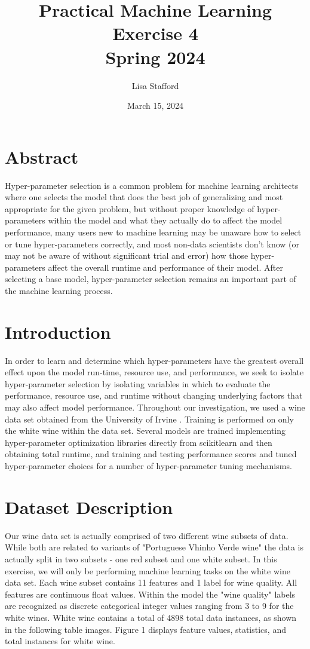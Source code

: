 \documentclass[titlepage]{article}
\title{%
	Practical Machine Learning\\
	
	\vspace*{2em}
	\LARGE Exercise 4\\
	Spring 2024}
\author{Lisa Stafford}
\date{March 15, 2024}
\begin{document}
	\setlength\parindent{0pt}
	
	\maketitle
	
	\section*{Abstract}
	Hyper-parameter selection is a common problem for machine learning architects where one selects the model that does the best job of generalizing and most appropriate for the given problem, but without proper knowledge of hyper-parameters within the model and what they actually do to affect the model performance, many users new to machine learning may be unaware how to select or tune hyper-parameters correctly, and most non-data scientists don't know (or may not be aware of without significant trial and error) how those hyper-parameters affect the overall runtime and performance of their model.  After selecting a base model, hyper-parameter selection remains an important part of the machine learning process.  
	
	\section*{Introduction}
	In order to learn and determine which hyper-parameters have the greatest overall effect upon the model run-time, resource use, and performance, we seek to isolate hyper-parameter selection by isolating variables in which to evaluate the performance, resource use, and runtime without changing underlying factors that may also affect model performance.  Throughout our investigation, we used a wine data set obtained from the University of Irvine \cite{dataset}. Training is performed on only the white wine within the data set.  Several models are trained implementing hyper-parameter optimization libraries directly from scikitlearn \cite{scikitlearn} and then obtaining total runtime, and training and testing performance scores and tuned hyper-parameter choices for a number of hyper-parameter tuning mechanisms.  
	

	\section*{Dataset Description}
	Our wine data set is actually comprised of two different wine subsets of data.  While both are related to variants of \cite{dataset} "Portuguese Vhinho Verde wine" the data is actually split in two subsets - one red subset and one white subset.  In this exercise, we will only be performing machine learning tasks on the white wine data set.  Each wine subset contains 11 features and 1 label for wine quality.   All features are continuous float values.  Within the model the "wine quality" labels are recognized as discrete categorical integer values ranging from 3 to 9 for the white wines.  White wine contains a total of 4898 total data instances, as shown in the following table images. Figure 1 displays feature values, statistics, and total instances for white wine.
	
\end{document}
